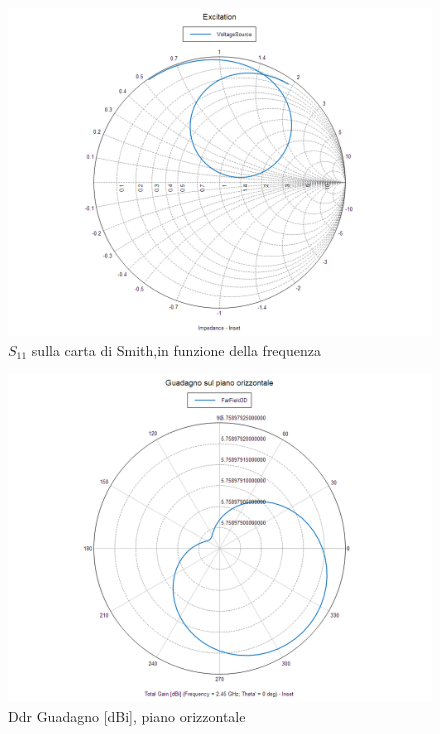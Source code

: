 \documentclass[twoside,twocolumn]{article}
\begin{document}
\begin{figure}[h!]
  \includegraphics[width=\linewidth]{A_Smith.png}
  \caption{$S_{11} $ sulla carta di Smith,in funzione della frequenza}
  \label{fig:A_Smith}
\end{figure}

\begin{figure}[h!]
  \includegraphics[width=\linewidth]{A_orizzontale.png}
  \caption{Ddr Guadagno [dBi], piano orizzontale}
  \label{fig:A_orizzontale}
\end{figure}
\end{document}
